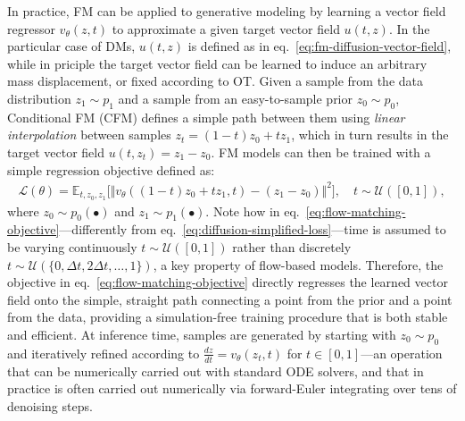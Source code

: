 In practice, FM can be applied to generative modeling by learning a vector field regressor \( v_\theta(z, t) \) to approximate a given target vector field \( u(t, z) \).
In the particular case of DMs, \( u(t, z) \) is defined as in eq.~\ref{eq:fm-diffusion-vector-field}, while in priciple the target vector field can be learned to induce an arbitrary mass displacement, or fixed according to OT.
Given a sample from the data distribution \( z_1 \sim p_1 \) and a sample from an easy-to-sample prior \( z_0 \sim p_0 \), Conditional FM (CFM) defines a simple path between them using \emph{linear interpolation} between samples \( z_t = (1-t)z_0 + t z_1 \), which in turn results in the target vector field \( u(t, z_t) = z_1 - z_0 \).
FM models can then be trained with a simple regression objective defined as:
\begin{align}\label{eq:flow-matching-objective}
    \mathcal L(\theta) = \mathbb{E}_{t, z_0, z_1} \big[
        \Vert v_\theta((1-t)z_0 + t z_1, t) - (z_1 - z_0) \Vert^2 \big], \quad t \sim \mathcal{U}([0,1]),
\end{align}
where \( z_0 \sim p_0(\bullet) \) and \( z_1 \sim p_1(\bullet) \). 
Note how in eq.~\ref{eq:flow-matching-objective}---differently from eq.~\ref{eq:diffusion-simplified-loss}---time is assumed to be varying continuously \( t \sim \mathcal U([0,1]) \) rather than discretely \( t \sim \mathcal U(\{0, \Delta t, 2 \Delta t, \dots, 1 \})\), a key property of flow-based models.
Therefore, the objective in eq.~\ref{eq:flow-matching-objective} directly regresses the learned vector field onto the simple, straight path connecting a point from the prior and a point from the data, providing a simulation-free training procedure that is both stable and efficient.
At inference time, samples are generated by starting with \( z_0 \sim p_0 \) and iteratively refined according to \( \frac{dz}{dt} = v_\theta(z_t, t) \) for \(t \in [0,1] \)---an operation that can be numerically carried out with standard ODE solvers, and that in practice is often carried out numerically via forward-Euler integrating over tens of denoising steps.

